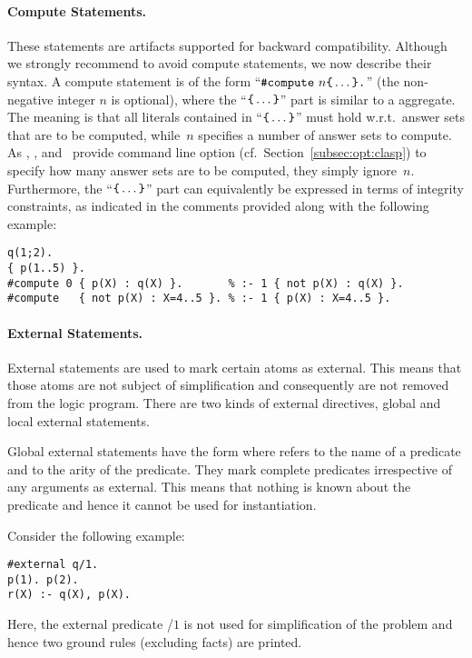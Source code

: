 \paragraph{Compute Statements.}
%
These statements are artifacts supported for backward compatibility.
Although we strongly recommend to avoid compute statements,
we now describe their syntax.
A compute statement is of the form
``$\const{\#compute}~n \code{\char`\{}\dots\code{\char`\}}\code{.}$''
(the non-negative integer $n$ is optional),
where the ``$\code{\char`\{}\dots\code{\char`\}}$'' part
is similar to a  aggregate.
The meaning is that all literals contained in
``$\code{\char`\{}\dots\code{\char`\}}$'' must hold w.r.t.\ answer sets
that are to be computed,
while~$n$ specifies a number of answer sets to compute.
As \clasp, \clingo, and \iclingo\ provide command line option
 (cf.\ Section~\ref{subsec:opt:clasp})
to specify how many answer sets are to be computed,
they simply ignore~$n$.
Furthermore,
the ``$\code{\char`\{}\dots\code{\char`\}}$'' part can equivalently
be expressed in terms of integrity constraints,
as indicated in the comments provided along with the following example:
%
\begin{lstlisting}[xrightmargin=-20pt,numbers=none]
q(1;2).
{ p(1..5) }.
#compute 0 { p(X) : q(X) }.       % :- 1 { not p(X) : q(X) }.
#compute   { not p(X) : X=4..5 }. % :- 1 { p(X) : X=4..5 }.
\end{lstlisting}

\paragraph{External Statements.}
%
External statements are used to mark certain atoms as external. This means 
that those atoms are not subject of simplification and consequently are not removed 
from the logic program. There are two kinds of external directives, 
global and local external statements.

Global external statements have the form  where 
 refers to the name of a predicate and  to the arity of the predicate.
They mark complete predicates irrespective of any arguments as external.
This means that nothing is known about the predicate and hence it cannot be used 
for instantiation.
\begin{example}
Consider the following example:
\begin{lstlisting}[numbers=none]
#external q/1.
p(1). p(2).
r(X) :- q(X), p(X).
\end{lstlisting}
Here, the external predicate /$1$ is not used for simplification
of the problem and hence two ground rules (excluding facts) are printed.
\eexample
\end{example}

